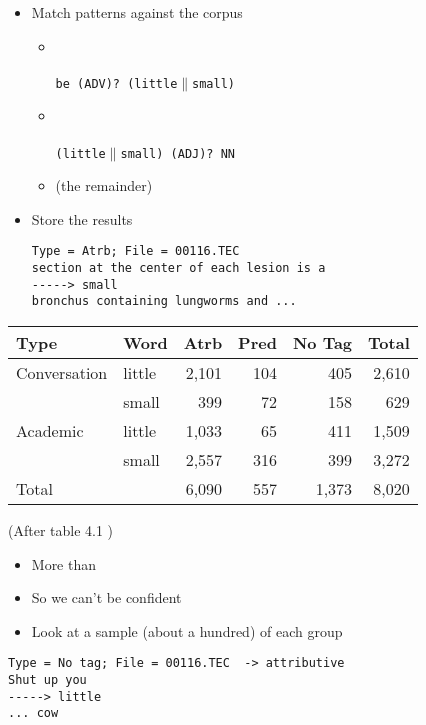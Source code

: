 \documentclass[a4paper,landscape,headrule,footrule,dvips]{foils}
\begin{document}
\begin{CJK}{UTF8}{min}
\begin{itemize}
\item Match patterns against the corpus
\begin{itemize}
\item {}
  \\ 
  \\ \texttt{be (ADV)? (little$\|$small)}
\item {}
  \\ 
 \\  \texttt{(little$\|$small) (ADJ)? NN}
\item {} (the remainder)
\end{itemize}
\item Store the results
\begin{verbatim}
Type = Atrb; File = 00116.TEC
section at the center of each lesion is a 
-----> small
bronchus containing lungworms and ...
\end{verbatim}
\end{itemize}


\begin{tabular}{llrrrr}
  Type & Word & Atrb & Pred & No Tag & Total \\ 
\hline\hline
Conversation & little & 2,101 & 104 & 405 & 2,610 \\
             & small &   399 & 72 & 158 & 629 \\   
\hline
Academic & little & 1,033 & 65 & 411 & 1,509 \\
             & small & 2,557 & 316 & 399 & 3,272 \\
\hline
Total  & & 6,090& 557 & 1,373 & 8,020 
\end{tabular}

(After table 4.1 \citep[p 91]{Biber:Conrad:Reppen:1998})

\begin{itemize}
\item More  than 
\item So we can't be confident
\item Look at a sample (about a hundred) of each group
  
\end{itemize}

\begin{verbatim}
Type = No tag; File = 00116.TEC  -> attributive
Shut up you 
-----> little
... cow


\end{verbatim}
\end{CJK}
\end{document}
